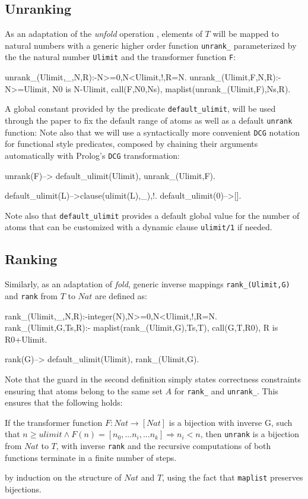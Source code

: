 \documentclass[]{INCLUDES/llncs}
\begin{document}
\subsection{Unranking} As an adaptation of the {\em unfold} 
operation \cite{DBLP:journals/jfp/Hutton99,DBLP:conf/fpca/MeijerH95}, 
elements of $T$ will be mapped to natural numbers with a generic 
higher order function {\tt unrank\_} parameterized by the the natural number
{\tt Ulimit} and the transformer function {\tt F}:

\begin{code}
unrank_(Ulimit,_,N,R):-N>=0,N<Ulimit,!,R=N.
unrank_(Ulimit,F,N,R):-N>=Ulimit,
  N0 is N-Ulimit,
  call(F,N0,Ns),
  maplist(unrank_(Ulimit,F),Ns,R).
\end{code}
 A global constant provided by the predicate {\tt default\_ulimit},
will be used
through the paper to fix the default range of atoms as
 well as a default {\tt unrank} function:
Note also that we will use a syntactically more convenient {\tt DCG} 
notation for functional style
predicates, composed by chaining their arguments automatically with 
Prolog's {\tt DCG} transformation:
\begin{code}
unrank(F)-->
  default_ulimit(Ulimit),
  unrank_(Ulimit,F).

default_ulimit(L)-->{clause(ulimit(L),_)},!.
default_ulimit(0)-->[].
\end{code}
Note also that {\tt default\_ulimit} provides a default global value for
the number of atoms that can be customized with a dynamic clause {\tt ulimit/1}
if needed.

\subsection{Ranking} Similarly, as an adaptation of {\em fold}, generic inverse 
mappings {\tt rank\_(Ulimit,G)} and {\tt rank} from $T$ to $Nat$ are defined
as:
\begin{code}
rank_(Ulimit,_,N,R):-integer(N),N>=0,N<Ulimit,!,R=N.
rank_(Ulimit,G,Ts,R):-
  maplist(rank_(Ulimit,G),Ts,T),
  call(G,T,R0),
  R is R0+Ulimit.

rank(G)-->
  default_ulimit(Ulimit),
  rank_(Ulimit,G).  
\end{code}
Note that the guard in the second definition simply states 
correctness constraints ensuring 
that atoms belong to the same set $A$ for {\tt rank\_} and {\tt unrank\_}. 
This ensures that the following holds:

\begin{prop}
If the transformer function $F:Nat \rightarrow [Nat]$ is a bijection with
inverse G, such that $n \geq ulimit \wedge F(n)=[n_0,...n_i,...n_k]
\Rightarrow n_i<n$, then {\tt unrank} is a bijection from $Nat$ to $T$, 
with inverse {\tt rank} and the recursive computations 
of both functions terminate in a finite number of steps.

 by induction on the structure of $Nat$ and $T$, using the
fact that {\tt maplist} preserves bijections.
\end{prop}
\end{document}
